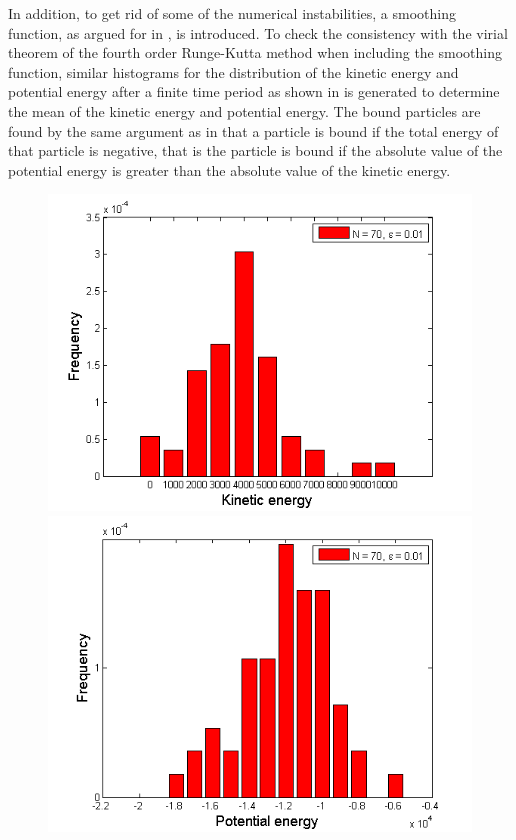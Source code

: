 In addition, to get rid of some of the numerical instabilities, a smoothing function, as argued for in , is introduced.
To check the consistency with the virial theorem of the fourth order Runge-Kutta method when including the smoothing function, similar histograms for the distribution of the kinetic energy and potential energy after a finite time period as shown in  is generated to determine the mean of the kinetic energy and potential energy.
The bound particles are found by the same argument as in  that a particle is bound if the total energy of that particle is negative, that is the particle is bound if the absolute value of the potential energy is greater than the absolute value of the kinetic energy.
\begin{figure}[H]
\centering
\begin{minipage}{.5\textwidth}
  \centering
  \includegraphics[width=1\linewidth]{Figures/Histograms_including_epsilon/N_70_e_n3_kin.png}
\end{minipage}%
\begin{minipage}{.5\textwidth}
  \centering
  \includegraphics[width=1\linewidth]{Figures/Histograms_including_epsilon/N_70_e_n3_pot.png}

\end{minipage}
\end{figure}
